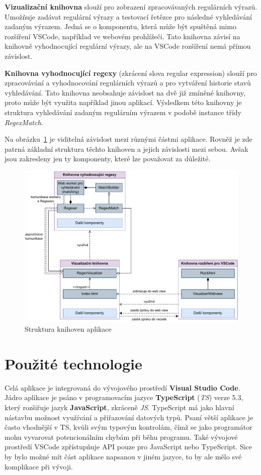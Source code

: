 \textbf{Vizualizační knihovna} slouží pro zobrazení zpracovávaných regulárních výrazů.
Umožňuje zadávat regulární výrazy a testovací řetězce pro následné vyhledávání zadaným výrazem.
Jedná se o komponentu, která může být spuštěná mimo rozšíření VSCode, například ve webovém prohlížeči.
Tato knihovna závisí na knihovně vyhodnocující regulární výrazy, ale na VSCode rozšíření nemá přímou závislost.

\textbf{Knihovna vyhodnocující regexy} (zkrácení slova regular expression) slouží pro zpracovávání a vyhodnocování regulárních výrazů a pro vytváření historie stavů vyhledávání.
Tato knihovna neobsahuje závislost na dvě již zmíněné knihovny, proto může být využita například jinou aplikací.
Výsledkem této knihovny je struktura vyhledávání zadaným regulárním výrazem v podobě instance třídy \textit{RegexMatch}.

Na obrázku~\ref{fig:ARCH} je viditelná závislost mezi různými částmi aplikace. 
Rovněž je zde patrná základní struktura těchto knihoven a jejich závislosti mezi sebou.
Avšak jsou zakresleny jen ty komponenty, které lze považovat za důležité. 

\begin{figure}[!h]
	\centering
	\includegraphics[width=.9\textwidth]{Figures/BP-Arch.pdf}
	\caption{Struktura knihoven aplikace}
	\label{fig:ARCH}
\end{figure}

\newpage

\section{Použité technologie}\label{sec:USEDtech}
Celá aplikace je integrovaná do vývojového prostředí \textbf{Visual Studio Code}\cite{Microsoft_2021a}. 
Jádro aplikace je psáno v programovacím jazyce \textbf{TypeScript}\cite{TypeScript} (\textit{TS}) verze 5.3, který rozšiřuje jazyk \textbf{JavaScript}, zkráceně \textit{JS}. 
TypeScript má jako hlavní nástavbu možnost využívání a přiřazování datových typů.
Psaní větší aplikace je často vhodnější v TS, kvůli svým typovým kontrolám, čímž se jako programátor mohu vyvarovat potencionálním chybám při běhu programu.
Také vývojové prostředí VSCode zpřístupňuje API pouze pro JavaScript nebo TypeScript.
Sice by bylo možné mít část aplikace napsanou v jiném jazyce, to by ale mělo své komplikace při vývoji.

